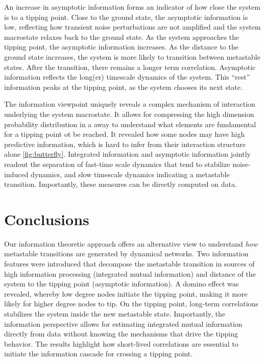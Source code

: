 \documentclass[a4paper, 11pt, twocolumn]{article}
\begin{document}
An increase in asymptotic  information forms an indicator of
how close  the system is  to a  tipping point. Close  to the
ground state, the asymptotic  information is low, reflecting
how transient noise perturbations  are not amplified and the
system macrostate relaxes  back to the ground  state. As the
system   approaches  the   tipping  point,   the  asymptotic
information increases.  As the distance to  the ground state
increases, the  system is more likely  to transition between
metastable  states. After  the transition,  there remains  a
longer term correlation. Asymptotic information reflects the
long(er)  timescale  dynamics  of the  system.  This  ``rest''
information  peaks  at  the  tipping point,  as  the  system
chooses its next state.

The  information   viewpoint  uniquely  reveals   a  complex
mechanism of  interaction underlying the  system macrostate.
It  allows for  compressing the  high dimension  probability
distribution  in  a away  to  understand  what elements  are
fundamental for a  tipping point ot be  reached. It revealed
how some  nodes may have high  predictive information, which
is  hard to  infer  from their  interaction structure  alone
\cref{fig:butterfly}. Integrated  information and asymptotic
information  jointly  readout  the separation  of  fast-time
scale   dynamics  that   tend  to   stabilize  noise-induced
dynamics,   and  slow   timescale   dynamics  indicating   a
metastable  transition. Importantly,  these measures  can be
directly computed on data.

\section{Conclusions}
\label{sec:org7971cd6}
Our  information theoretic  approach  offers an  alternative
view   to  understand   \emph{how}  metastable   transitions  are
generated  by dynamical  networks. Two  information features
were introduced that decompose  the metastable transition in
sources  of high  information processing  (integrated mutual
information) and distance of the system to the tipping point
(asymptotic  information).  A  domino effect  was  revealed,
whereby low degree nodes  initiate the tipping point, making
it  more likely  for  higher  degree nodes  to  tip. On  the
tipping point, long-term  correlations stabilizes the system
inside   the   new   metastable  state.   Importantly,   the
information  perspective  allows for  estimating  integrated
mutual information  directly from  data without  knowing the
mechanisms  that drive  the  tipping  behavior. The  results
highlight  how  short-lived  correlations are  essential  to
initiate  the information  cascade  for  crossing a  tipping
point.
\end{document}
